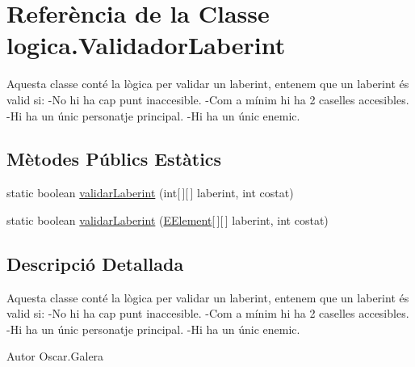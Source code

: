 \hypertarget{classlogica_1_1_validador_laberint}{\section{Referència de la Classe logica.\+Validador\+Laberint}
\label{classlogica_1_1_validador_laberint}
}


Aquesta classe conté la lògica per validar un laberint, entenem que un laberint és valid si\+: -\/\+No hi ha cap punt inaccesible. -\/\+Com a mínim hi ha 2 caselles accesibles. -\/\+Hi ha un únic personatje principal. -\/\+Hi ha un únic enemic.  


\subsection*{Mètodes Públics Estàtics}
\begin{DoxyCompactItemize}
\item 
static boolean \hyperlink{classlogica_1_1_validador_laberint_ae68bc2619d7584ee5706305220edf18f}{validar\+Laberint} (int\mbox{[}$\,$\mbox{]}\mbox{[}$\,$\mbox{]} laberint, int costat)
\item 
static boolean \hyperlink{classlogica_1_1_validador_laberint_ab3c011bc020892b76d217106b2903bd4}{validar\+Laberint} (\hyperlink{enumlogica_1_1enumeracions_1_1_e_element}{E\+Element}\mbox{[}$\,$\mbox{]}\mbox{[}$\,$\mbox{]} laberint, int costat)
\end{DoxyCompactItemize}


\subsection{Descripció Detallada}
Aquesta classe conté la lògica per validar un laberint, entenem que un laberint és valid si\+: -\/\+No hi ha cap punt inaccesible. -\/\+Com a mínim hi ha 2 caselles accesibles. -\/\+Hi ha un únic personatje principal. -\/\+Hi ha un únic enemic. 

\begin{DoxyAuthor}{Autor}
Oscar.\+Galera 
\end{DoxyAuthor}


